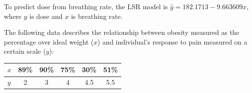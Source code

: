\documentclass[bigtut]{tutorial}\usepackage[]{graphicx}\usepackage[]{color}
\begin{document}
\begin{tutorial}
\begin{questions}
\begin{solution}
To predict dose from breathing rate, the LSR model is $\hat{y} = 182.1713  -9.663609x$,
where $y$ is dose and $x$ is breathing rate.

\end{solution}

\question 

The following data describes the relationship between obesity  measured as
    the percentage over ideal weight ($x$) and individual's response to pain 
    measured on a certain scale ($y$):
    \begin{center}\begin{tabular}{l|ccccc} $x$ & 89\% & 90\% & 75\% & 30\%
    & 51\% \\\hline $y$ & 2 & 3 & 4 & 4.5 & 5.5
    \end{tabular}
    \end{center}



\end{questions}
\end{tutorial}
\end{document}
